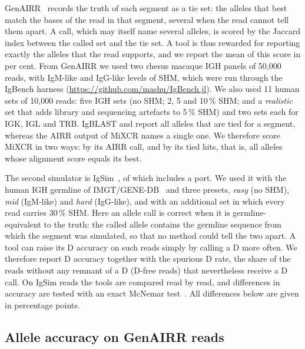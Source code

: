 \documentclass[11pt,a4paper]{article}
\begin{document}
GenAIRR~\cite{konstantinovsky2024genairr} records the truth of each segment
as a tie set: the alleles that best match the bases of the read in that
segment, several when the read cannot tell them apart. A call, which may
itself name several
alleles, is scored by the Jaccard index between the called set and the tie
set. A tool is thus rewarded for reporting exactly the alleles that the read
supports, and we report the mean of this score in per cent. From GenAIRR we
used two rhesus macaque IGH panels of 50,000 reads, with IgM-like and
IgG-like levels of SHM, which were run through the IgBench harness
(\url{https://github.com/mashu/IgBench.jl}). We also used 11 human sets of
10,000 reads: five IGH sets (no SHM; 2, 5 and 10\,\% SHM; and a
\emph{realistic} set that adds library and sequencing artefacts to 5\,\%
SHM) and two sets each for IGK, IGL and TRB. IgBLAST and \swig{} report all
alleles that are tied for a segment, whereas the AIRR output of MiXCR names
a single one. We therefore score MiXCR in two ways: by its AIRR call, and by
its tied hits, that is, all alleles whose alignment score equals its best.

The second simulator is IgSim~\cite{igsimjl}, of which \swig{} includes a
port. We used it with the human IGH germline of
IMGT/GENE-DB~\cite{giudicelli2005genedb} and three presets, \emph{easy}
(no SHM), \emph{mid} (IgM-like) and \emph{hard} (IgG-like), and with an
additional set in which every read carries 30\,\% SHM. Here an allele call
is correct when it is germline-equivalent to the truth: the called allele
contains the germline sequence from which the segment was simulated, so that
no method could tell the two apart. A tool can raise its D accuracy on such
reads simply by calling a D more often. We therefore report D accuracy
together with the spurious D rate, the share of the reads without any
remnant of a D (D-free reads) that nevertheless receive a D call. On IgSim
reads the tools are compared read by read, and differences in accuracy are
tested with an exact McNemar test~\cite{mcnemar1947}. All differences below
are given in percentage points.

\subsection{Allele accuracy on GenAIRR reads}
\label{sec:genairr}
\end{document}
